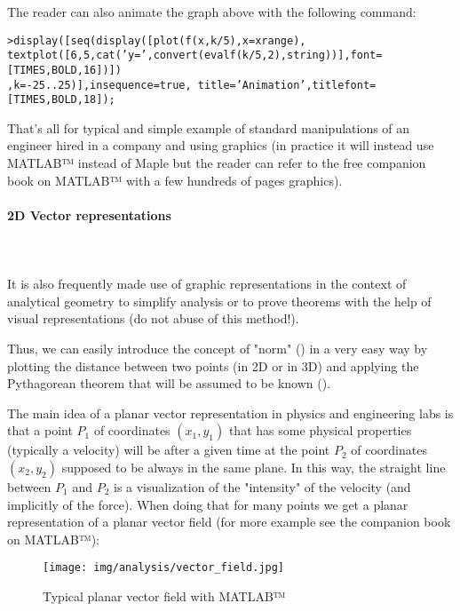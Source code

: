 The reader can also animate the graph above with the following command:

\texttt{>display([seq(display([plot(f(x,k/5),x=xrange),}\\ \texttt{textplot([6,5,cat('y=',convert(evalf(k/5,2),string))],font=[TIMES,BOLD,16])])}\\
\texttt{,k=-25..25)],insequence=true, title='Animation',titlefont=[TIMES,BOLD,18]);}

That's all for typical and simple example of standard manipulations of an engineer hired in a company and using graphics (in practice it will instead use MATLAB™ instead of Maple but the reader can refer to the free companion book on MATLAB™ with a few hundreds of pages graphics).

\paragraph{2D Vector representations}\mbox{}\\\\
It is also frequently made use of graphic representations in the context of analytical geometry to simplify analysis or to prove theorems with the help of visual representations (do not abuse of this method!).

Thus, we can easily introduce the concept of "norm" () in a very easy way by plotting the distance between two points (in 2D or in 3D) and applying the Pythagorean theorem that will be assumed to be known ().

The main idea of a planar vector representation in physics and engineering labs is that  a point $P_1$ of coordinates $(x_1,y_1)$ that has some physical properties (typically a velocity) will be after a given time at the point $P_2$ of coordinates $(x_2,y_2)$ supposed to be always in the same plane. In this way, the straight line between $P_1$ and $P_2$ is a visualization of the "intensity" of the velocity (and implicitly of the force). When doing that for many points we get a planar representation of a planar vector field (for more example see the companion book on MATLAB™):

\begin{figure}[H]
\centering
\texttt{[image: img/analysis/vector\_field.jpg]}
\caption[]{Typical planar vector field with MATLAB™}
\end{figure}


